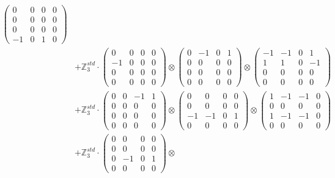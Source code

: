 \documentclass{article}
\begin{document}
{\begin{align}
            \begin{pmatrix} 0 & 0 & 0 & 0 \\ 0 & 0 & 0 & 0 \\ 0 & 0 & 0 & 0 \\ -1 & 0 & 1 & 0 \end{pmatrix} \\ 
        &+ \label{Rs16-Rc11-Solution-30-c25} \mathbb{Z}_3^{std} \cdot 
            \begin{pmatrix} 0 & 0 & 0 & 0 \\ -1 & 0 & 0 & 0 \\ 0 & 0 & 0 & 0 \\ 0 & 0 & 0 & 0 \end{pmatrix} \otimes 
            \begin{pmatrix} 0 & -1 & 0 & 1 \\ 0 & 0 & 0 & 0 \\ 0 & 0 & 0 & 0 \\ 0 & 0 & 0 & 0 \end{pmatrix} \otimes 
            \begin{pmatrix} -1 & -1 & 0 & 1 \\ 1 & 1 & 0 & -1 \\ 0 & 0 & 0 & 0 \\ 0 & 0 & 0 & 0 \end{pmatrix} \\ 
        &+ \label{Rs16-Rc11-Solution-30-c26} \mathbb{Z}_3^{std} \cdot 
            \begin{pmatrix} 0 & 0 & -1 & 1 \\ 0 & 0 & 0 & 0 \\ 0 & 0 & 0 & 0 \\ 0 & 0 & 0 & 0 \end{pmatrix} \otimes 
            \begin{pmatrix} 0 & 0 & 0 & 0 \\ 0 & 0 & 0 & 0 \\ -1 & -1 & 0 & 1 \\ 0 & 0 & 0 & 0 \end{pmatrix} \otimes 
            \begin{pmatrix} 1 & -1 & -1 & 0 \\ 0 & 0 & 0 & 0 \\ 1 & -1 & -1 & 0 \\ 0 & 0 & 0 & 0 \end{pmatrix} \\ 
        &+ \label{Rs16-Rc11-Solution-30-c27} \mathbb{Z}_3^{std} \cdot 
            \begin{pmatrix} 0 & 0 & 0 & 0 \\ 0 & 0 & 0 & 0 \\ 0 & -1 & 0 & 1 \\ 0 & 0 & 0 & 0 \end{pmatrix} \otimes 

\end{align}}
\end{document}
